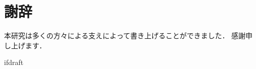 \documentclass[11pt]{report}
\begin{document}
\fi

\chapter*{謝辞}
本研究は多くの方々による支えによって書き上げることができました．
感謝申し上げます．

\expandafter\ifx\csname ifdraft\endcsname\relax
  
\end{document}
